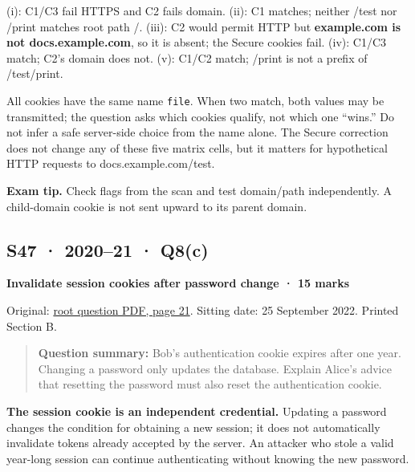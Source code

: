 \documentclass[11pt,a4paper]{article}
\begin{document}
(i): C1/\allowbreak{}C3 fail HTTPS and C2 fails domain. (ii): C1 matches; neither /\allowbreak{}test nor /\allowbreak{}print matches root path /\allowbreak{}. (iii): C2 would permit HTTP but \textbf{example.\allowbreak{}com is not docs.\allowbreak{}example.\allowbreak{}com},\allowbreak{} so it is absent; the Secure cookies fail. (iv): C1/\allowbreak{}C3 match; C2’s domain does not. (v): C1/\allowbreak{}C2 match; /\allowbreak{}print is not a prefix of /\allowbreak{}test/\allowbreak{}print.


All cookies have the same name \texttt{file}. When two match,\allowbreak{} both values may be transmitted; the question asks which cookies qualify,\allowbreak{} not which one “wins.” Do not infer a safe server-side choice from the name alone. The Secure correction does not change any of these five matrix cells,\allowbreak{} but it matters for hypothetical HTTP requests to docs.\allowbreak{}example.\allowbreak{}com/\allowbreak{}test.



{\color{ForestGreen}\textbf{Exam tip.} Check flags from the scan and test domain/\allowbreak{}path independently. A child-domain cookie is not sent upward to its parent domain.}




\clearpage
\subsection{S47 · 2020–21 · Q8(c)}\label{s47}

\textbf{Invalidate session cookies after password change · 15 marks}


Original: \href{../../CSE405-Security_Merged.pdf\#page=21}{root question PDF,\allowbreak{} page 21}. Sitting date: 25 September 2022. Printed Section B.



\begin{quote}\small

\textbf{Question summary:} Bob’s authentication cookie expires after one year. Changing a password only updates the database. Explain Alice’s advice that resetting the password must also reset the authentication cookie.



\end{quote}

\textbf{The session cookie is an independent credential.} Updating a password changes the condition for obtaining a new session; it does not automatically invalidate tokens already accepted by the server. An attacker who stole a valid year-long session can continue authenticating without knowing the new password.
\end{document}
